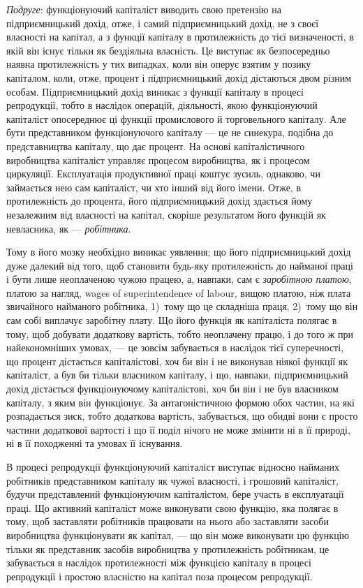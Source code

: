 \emph{Подруге}: функціонуючий капіталіст виводить свою претензію
на підприємницький дохід, отже, і самий підприємницький дохід,
не з своєї власності на капітал, а з функції капіталу в протилежність
до тієї визначеності, в якій він існує тільки як бездіяльна
власність. Це виступає як безпосередньо наявна протилежність
у тих випадках, коли він оперує взятим у позику капіталом,
коли, отже, процент і підприємницький дохід дістаються
двом різним особам. Підприємницький дохід виникає з функції
капіталу в процесі репродукції, тобто в наслідок операцій, діяльності,
якою функціонуючий капіталіст опосереднює ці функції
промислового й торговельного капіталу. Але бути представником
функціонуючого капіталу — це не синекура, подібна до представництва
капіталу, що дає процент. На основі капіталістичного
виробництва капіталіст управляє процесом виробництва, як і процесом
циркуляції. Експлуатація продуктивної праці коштує зусиль,
однаково, чи займається нею сам капіталіст, чи хто інший від його
імени. Отже, в протилежність до процента, його підприємницький
дохід здається йому незалежним від власності на капітал,
скоріше результатом його функцій як невласника, як — \emph{робітника}.

Тому в його мозку необхідно виникає уявлення; що його підприємницький
дохід дуже далекий від того, щоб становити будь-яку
протилежність до найманої праці і бути лише неоплаченою чужою
працею, а, навпаки, сам є \emph{заробітною платою}, платою за нагляд,
wages of superintendence of labour, вищою платою, ніж плата звичайного
найманого робітника, 1)~тому що це складніша праця, 2)~тому
що він сам собі виплачує заробітну плату. Що його функція
як капіталіста полягає в тому, щоб добувати додаткову вартість,
тобто неоплачену працю, і до того ж при найекономніших умовах,
— це зовсім забувається в наслідок тієї суперечності, що процент
дістається капіталістові, хоч би він і не виконував ніякої
функції як капіталіст, а був би тільки власником капіталу, і що,
навпаки, підприємницький дохід дістається функціонуючому капіталістові,
хоч би він і не був власником капіталу, з яким він
функціонує. За антагоністичною формою обох частин, на які
розпадається зиск, тобто додаткова вартість, забувається, що
обидві вони є просто частини додаткової вартості і що її поділ
нічого не може змінити ні в її природі, ні в її походженні та
умовах її існування.

В процесі репродукції функціонуючий капіталіст виступає
відносно найманих робітників представником капіталу як чужої
власності, і грошовий капіталіст, будучи представлений функціонуючим
капіталістом, бере участь в експлуатації праці. Що
активний капіталіст може виконувати свою функцію, яка полягає
в тому, щоб заставляти робітників працювати на нього або
заставляти засоби виробництва функціонувати як капітал, — що
він може виконувати цю функцію тільки як представник засобів
виробництва у протилежність робітникам, це забувається
в наслідок протилежності між функцією капіталу в процесі
репродукції і простою власністю на капітал поза процесом
репродукції.

